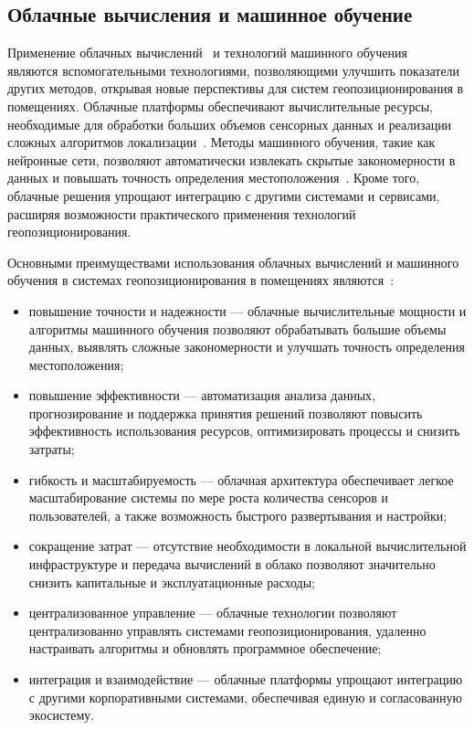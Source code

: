 
\subsection{Облачные вычисления и машинное обучение}

Применение облачных вычислений~\cite{cloudcomp} и технологий машинного обучения~\cite{mltech} являются вспомогательными технологиями, позволяющими улучшить показатели других методов, открывая новые перспективы для систем геопозиционирования в помещениях. Облачные платформы обеспечивают вычислительные ресурсы, необходимые для обработки больших объемов сенсорных данных и реализации сложных алгоритмов локализации~\cite{cloudML}. Методы машинного обучения, такие как нейронные сети, позволяют автоматически извлекать скрытые закономерности в данных и повышать точность определения местоположения~\cite{mltech}. Кроме того, облачные решения упрощают интеграцию с другими системами и сервисами, расширяя возможности практического применения технологий геопозиционирования.

Основными преимуществами использования облачных вычислений и машинного обучения в системах геопозиционирования в помещениях являются~\cite{cloudML}:

\begin{itemize}[label=---]
    \item повышение точности и надежности --- облачные вычислительные мощности и алгоритмы машинного обучения позволяют обрабатывать большие объемы данных, выявлять сложные закономерности и улучшать точность определения местоположения;
    \item повышение эффективности --- автоматизация анализа данных, прогнозирование и поддержка принятия решений позволяют повысить эффективность использования ресурсов, оптимизировать процессы и снизить затраты;
    \item гибкость и масштабируемость --- облачная архитектура обеспечивает легкое масштабирование системы по мере роста количества сенсоров и пользователей, а также возможность быстрого развертывания и настройки;
    \item сокращение затрат --- отсутствие необходимости в локальной вычислительной инфраструктуре и передача вычислений в облако позволяют значительно снизить капитальные и эксплуатационные расходы;
    \item централизованное управление --- облачные технологии позволяют централизованно управлять системами геопозиционирования, удаленно настраивать алгоритмы и обновлять программное обеспечение;
    \item интеграция и взаимодействие --- облачные платформы упрощают интеграцию с другими корпоративными системами, обеспечивая единую и согласованную экосистему.
\end{itemize}

